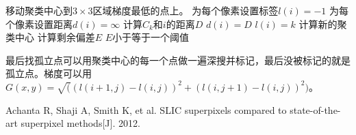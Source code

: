\documentclass[11pt, a4paper]{article}
\begin{document}
\begin{CJK}{UTF8}{song}
\begin{algorithm}
\begin{algorithmic}
\STATE 移动聚类中心到$3 \times 3$区域梯度最低的点上。
\STATE 为每个像素设置标签$l(i)=-1$
\STATE 为每个像素设置距离$d(i)=\infty$
\REPEAT
{}
\STATE 计算$C_k$和$i$的距离$D$
\STATE $d(i) = D$
\STATE $l(i) = k$
\ENDIF
\ENDFOR
\ENDFOR
\STATE 计算新的聚类中心
\STATE 计算剩余偏差$E$
\UNTIL $E$小于等于一个阈值
\end{algorithmic}
\end{algorithm}
最后找孤立点可以用聚类中心的每一个点做一遍深搜并标记，最后没被标记的就是孤立点。梯度可以用$G(x,y)=\sqrt((l(i + 1, j) - l(i, j)) ^ 2 + (l(i, j + 1) - l(i, j)) ^ 2)$。
\begin{thebibliography}{0}
	 Achanta R, Shaji A, Smith K, et al. SLIC superpixels compared to state-of-the-art superpixel methods[J]. 2012.
\end{thebibliography}
\end{CJK}
\end{document}
